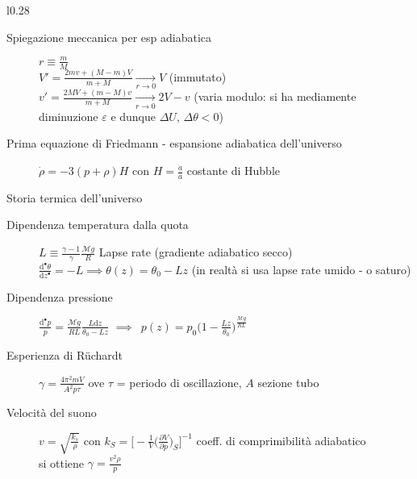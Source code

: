 \documentclass[10pt, oneside]{article}
\begin{document}
\begin{wrapfigure}{l}{0.28\textwidth}
\centering
{}
\vspace{-2cm}
\end{wrapfigure}
\noindent \begin{description}
\item[Spiegazione meccanica per esp adiabatica] $\displaystyle r \equiv \frac{m}{M}$
\\$\displaystyle V' = \frac{2m v + (M - m) V}{m+M} \xrightarrow[r \rightarrow 0]{} V$ (immutato) \\$\displaystyle v' = \frac{2M V + (m-M)v}{m+M} \xrightarrow[r \rightarrow 0]{} 2V - v$ (varia modulo: si ha mediamente diminuzione $\varepsilon$ e dunque $\Delta U, \, \Delta \theta < 0$)
\item[Prima equazione di Friedmann - espansione adiabatica dell'universo]
$\displaystyle \dot \rho = -3(p + \rho)H$ con $\displaystyle H = \frac{\dot a}{a}$ costante di Hubble
\item[Storia termica dell'universo]
\end{description}
\indent
\begin{description}
\item[Dipendenza temperatura dalla quota] $\displaystyle L \equiv \frac{\gamma - 1}{\gamma} \frac{\mathcal{M} g}{R}$ Lapse rate (gradiente adiabatico secco) $\displaystyle \frac{\mathrm{d}^{•} \theta}{\mathrm{d}z^{•}} = -L \implies \theta(z) = \theta_0 - Lz$ (in realtà si usa lapse rate umido - o saturo)
\item[Dipendenza pressione]$\displaystyle \frac{\mathrm{d}^{•} p}{p} = \frac{\mathcal{M}g}{RL}\frac{L \mathrm{d}z}{\theta_0 - Lz}$ $\implies \enspace p(z) = p_0 \bigg(\displaystyle 1 - \frac{Lz}{\theta_0}\bigg)^{\displaystyle \frac{\mathcal{M}g}{RL}}$
\item[Esperienza di R\"uchardt] $\displaystyle \gamma = \frac{4 \pi^2 mV}{A^2 p \tau}$ ove $\tau$ = periodo di oscillazione, $A$ sezione tubo
\item[Velocità del suono]$\displaystyle v = \sqrt{\frac{k_s}{\rho}}$ con $\displaystyle k_S = \bigg[-\frac{1}{V} \bigg(\frac{\partial V}{\partial p}\bigg)_S\bigg]^{-1}$ coeff. di comprimibilità adiabatico
\\si ottiene $\displaystyle \gamma = \frac{v^2 \rho}{p}$
\end{description}
\end{document}

